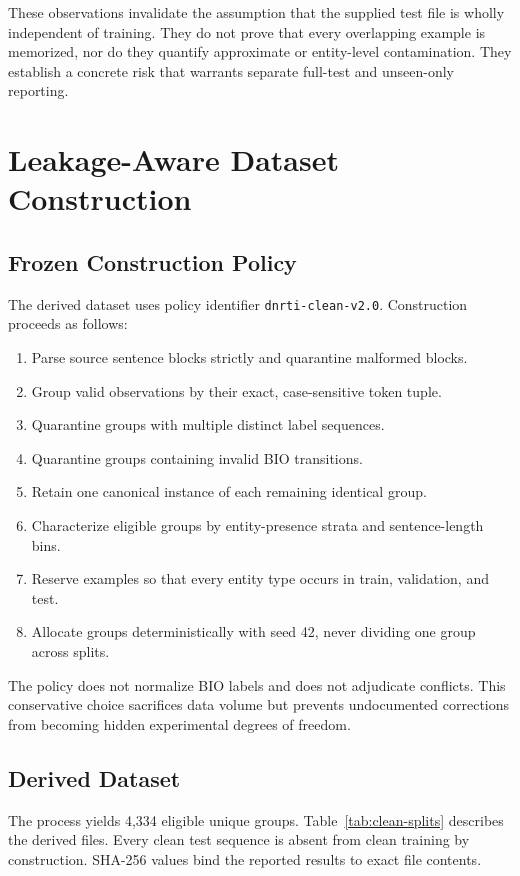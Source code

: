 \documentclass[conference]{IEEEtran}
\begin{document}
These observations invalidate the assumption that the supplied test file is wholly independent of training. They do not prove that every overlapping example is memorized, nor do they quantify approximate or entity-level contamination. They establish a concrete risk that warrants separate full-test and unseen-only reporting.

\section{Leakage-Aware Dataset Construction}
\subsection{Frozen Construction Policy}
The derived dataset uses policy identifier \texttt{dnrti-clean-v2.0}. Construction proceeds as follows:

\begin{enumerate}
    \item Parse source sentence blocks strictly and quarantine malformed blocks.
    \item Group valid observations by their exact, case-sensitive token tuple.
    \item Quarantine groups with multiple distinct label sequences.
    \item Quarantine groups containing invalid BIO transitions.
    \item Retain one canonical instance of each remaining identical group.
    \item Characterize eligible groups by entity-presence strata and sentence-length bins.
    \item Reserve examples so that every entity type occurs in train, validation, and test.
    \item Allocate groups deterministically with seed 42, never dividing one group across splits.
\end{enumerate}

The policy does not normalize BIO labels and does not adjudicate conflicts. This conservative choice sacrifices data volume but prevents undocumented corrections from becoming hidden experimental degrees of freedom.

\subsection{Derived Dataset}
The process yields 4,334 eligible unique groups. Table~\ref{tab:clean-splits} describes the derived files. Every clean test sequence is absent from clean training by construction. SHA-256 values bind the reported results to exact file contents.
\end{document}
